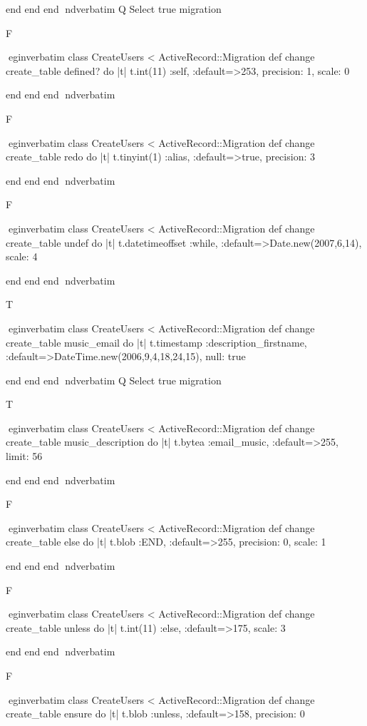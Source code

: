     end 
  end 
end
nd{verbatim}
Q
 Select true migration

F

egin{verbatim}
 class CreateUsers < ActiveRecord::Migration 
  def change 
    create_table defined? do |t| 
      t.int(11) :self, :default=>253, precision: 1, scale: 0
    
    end 
  end 
end
nd{verbatim}

F

egin{verbatim}
 class CreateUsers < ActiveRecord::Migration 
  def change 
    create_table redo do |t| 
      t.tinyint(1) :alias, :default=>true, precision: 3
    
    end 
  end 
end
nd{verbatim}

F

egin{verbatim}
 class CreateUsers < ActiveRecord::Migration 
  def change 
    create_table undef do |t| 
      t.datetimeoffset :while, :default=>Date.new(2007,6,14), scale: 4
    
    end 
  end 
end
nd{verbatim}

T

egin{verbatim}
 class CreateUsers < ActiveRecord::Migration 
  def change 
    create_table music_email do |t| 
      t.timestamp :description_firstname, :default=>DateTime.new(2006,9,4,18,24,15), null: true
    
    end 
  end 
end
nd{verbatim}
Q
 Select true migration

T

egin{verbatim}
 class CreateUsers < ActiveRecord::Migration 
  def change 
    create_table music_description do |t| 
      t.bytea :email_music, :default=>255, limit: 56
    
    end 
  end 
end
nd{verbatim}

F

egin{verbatim}
 class CreateUsers < ActiveRecord::Migration 
  def change 
    create_table else do |t| 
      t.blob :END, :default=>255, precision: 0, scale: 1
    
    end 
  end 
end
nd{verbatim}

F

egin{verbatim}
 class CreateUsers < ActiveRecord::Migration 
  def change 
    create_table unless do |t| 
      t.int(11) :else, :default=>175, scale: 3
    
    end 
  end 
end
nd{verbatim}

F

egin{verbatim}
 class CreateUsers < ActiveRecord::Migration 
  def change 
    create_table ensure do |t| 
      t.blob :unless, :default=>158, precision: 0
    

